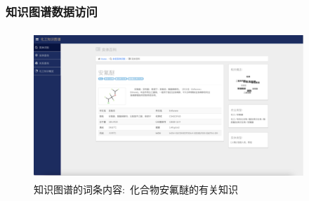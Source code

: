 \begin{frame}
	\frametitle{知识图谱数据访问}
\begin{figure}[h!]
\centering
\includegraphics[height=2.20in,width=4.00in,viewport=0 0 240 130,clip]{Figures/KG_Chem-Enflurane.png}
\caption{\tiny 知识图谱的词条内容:~化合物\textrm{安氟醚}的有关知识}%
\label{Fig:KG_Chem-Enflurane}
\end{figure}
\end{frame}

